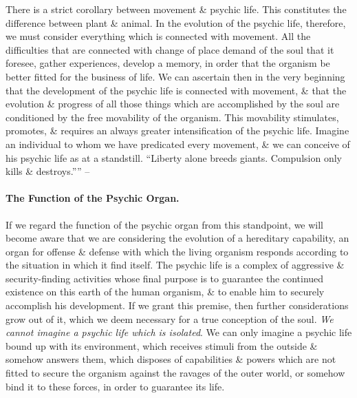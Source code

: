 \documentclass{article}
\begin{document}
There is a strict corollary between movement \& psychic life. This constitutes the difference between plant \& animal. In the evolution of the psychic life, therefore, we must consider everything which is connected with movement. All the difficulties that are connected with change of place demand of the soul that it foresee, gather experiences, develop a memory, in order that the organism be better fitted for the business of life. We can ascertain then in the very beginning that the development of the psychic life is connected with movement, \& that the evolution \& progress of all those things which are accomplished by the soul are conditioned by the free movability of the organism. This movability stimulates, promotes, \& requires an always greater intensification of the psychic life. Imagine an individual to whom we have predicated every movement, \& we can conceive of his psychic life as at a standstill. ``Liberty alone breeds giants. Compulsion only kills \& destroys.'''' -- \cite[pp. 17--18]{Adler_human_nature}

\paragraph*{The Function of the Psychic Organ.} If we regard the function of the psychic organ from this standpoint, we will become aware that we are considering the evolution of a hereditary capability, an organ for offense \& defense with which the living organism responds according to the situation in which it find itself. The psychic life is a complex of aggressive \& security-finding activities whose final purpose is to guarantee the continued existence on this earth of the human organism, \& to enable him to securely accomplish his development. If we grant this premise, then further considerations grow out of it, which we deem necessary for a true conception of the soul. {\it We cannot imagine a psychic life which is isolated}. We can only imagine a psychic life bound up with its environment, which receives stimuli from the outside \& somehow answers them, which disposes of capabilities \& powers which are not fitted to secure the organism against the ravages of the outer world, or somehow bind it to these forces, in order to guarantee its life.
\end{document}
